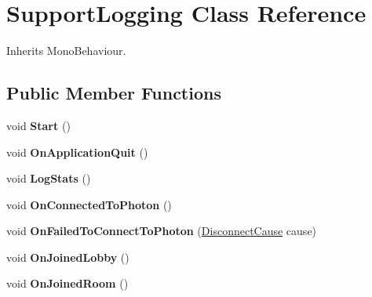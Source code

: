 \hypertarget{class_support_logging}{}\section{Support\+Logging Class Reference}
\label{class_support_logging}


Inherits Mono\+Behaviour.

\subsection*{Public Member Functions}
\begin{DoxyCompactItemize}
\item 
void {\bfseries Start} ()\hypertarget{class_support_logging_a8325891b30735e37ee21149ab01fc728}{}\label{class_support_logging_a8325891b30735e37ee21149ab01fc728}

\item 
void {\bfseries On\+Application\+Quit} ()\hypertarget{class_support_logging_ad3ba63b59fde5fae3ec3ae4757ab86ef}{}\label{class_support_logging_ad3ba63b59fde5fae3ec3ae4757ab86ef}

\item 
void {\bfseries Log\+Stats} ()\hypertarget{class_support_logging_a2cf1e7f4fdfb3329552d5506598046fe}{}\label{class_support_logging_a2cf1e7f4fdfb3329552d5506598046fe}

\item 
void {\bfseries On\+Connected\+To\+Photon} ()\hypertarget{class_support_logging_a2fd44e6b53c8ae0bf3742a534fb1136a}{}\label{class_support_logging_a2fd44e6b53c8ae0bf3742a534fb1136a}

\item 
void {\bfseries On\+Failed\+To\+Connect\+To\+Photon} (\hyperlink{group__public_api_gad61b1461cf60ad9e8d86923d111d5cc9}{Disconnect\+Cause} cause)\hypertarget{class_support_logging_a49bad1d64e88101d025b2df390a69c09}{}\label{class_support_logging_a49bad1d64e88101d025b2df390a69c09}

\item 
void {\bfseries On\+Joined\+Lobby} ()\hypertarget{class_support_logging_afd95b3b1a9408719cddbf961997ed25c}{}\label{class_support_logging_afd95b3b1a9408719cddbf961997ed25c}

\item 
void {\bfseries On\+Joined\+Room} ()\hypertarget{class_support_logging_a32ed60880380b9e3daca71cc166c179c}{}\label{class_support_logging_a32ed60880380b9e3daca71cc166c179c}


\end{DoxyCompactItemize}
